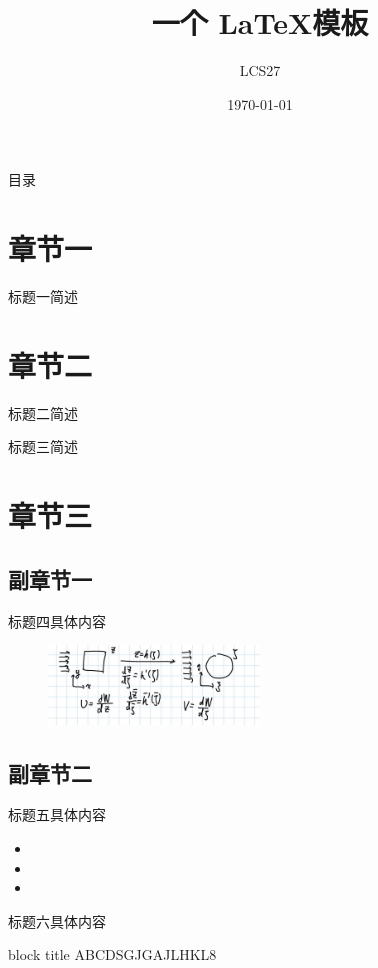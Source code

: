 \documentclass[aspectratio=169]{beamer}
\title{一个 \LaTeX 模板}
\author{LCS27}
\institute{我的学校学院}
\date{\today}
\begin{document}
\maketitle
\begin{frame}{目录}
\tableofcontents
\end{frame}
\section{章节一}
\begin{frame}{标题一}{简述}
\zhlipsum[10]
\end{frame}

\section{章节二}
\begin{frame}[allowframebreaks]{标题二}{简述}
\zhlipsum[11]
\end{frame}
\begin{frame}[allowframebreaks]{标题三}{简述}
\zhlipsum[12]
\end{frame}

\section{章节三}
\subsection{副章节一}
\begin{frame}[allowframebreaks]{标题四}{具体内容}
\zhlipsum[1]
\begin{figure}
    \centering
    \includegraphics[width=0.5\textwidth]{../picture/1.jpg}
\end{figure}
\end{frame}
\subsection{副章节二}
\begin{frame}[allowframebreaks]{标题五}{具体内容}
\zhlipsum[2]
\begin{itemize}
    \item \zhlipsum[3]
    \item \zhlipsum[4]
    \item \zhlipsum[5]
\end{itemize}
\end{frame}

\begin{frame}{标题六}{具体内容}
\begin{block}{block title}
ABCDSGJGAJLHKL8
\end{block}
\end{frame}
\end{document}

